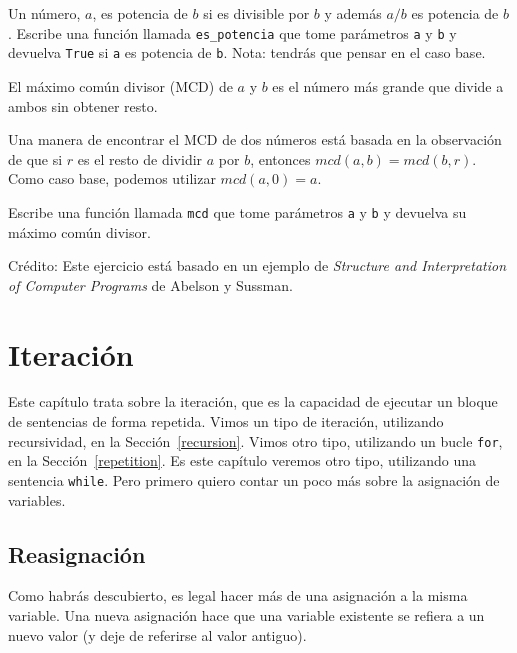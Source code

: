 \documentclass[10pt]{book}
\begin{document}
\begin{exercise}

Un número, $a$, es potencia de $b$ si es divisible por $b$
y además $a/b$ es potencia de $b$.  Escribe una función llamada
\verb"es_potencia" que tome parámetros {\tt a} y {\tt b}
y devuelva {\tt True} si {\tt a} es potencia de {\tt b}.
Nota: tendrás que pensar en el caso base.

\end{exercise}


\begin{exercise}

El máximo común divisor (MCD) de $a$ y $b$ es el número más grande
que divide a ambos sin obtener resto.

Una manera de encontrar el MCD de dos números está basada en la observación
de que si $r$ es el resto de dividir $a$ por $b$, entonces $mcd(a,
b) = mcd(b, r)$.  Como caso base, podemos utilizar $mcd(a, 0) = a$.

Escribe una función llamada
\verb"mcd" que tome parámetros {\tt a} y {\tt b}
y devuelva su máximo común divisor.

Crédito: Este ejercicio está basado en un ejemplo de
{\em Structure and Interpretation of Computer Programs} de Abelson y Sussman.

\end{exercise}


\chapter{Iteración}

Este capítulo trata sobre la iteración, que es la capacidad de ejecutar
un bloque de sentencias de forma repetida.  Vimos un tipo de iteración,
utilizando recursividad, en la Sección~\ref{recursion}.
Vimos otro tipo, utilizando un bucle {\tt for},
en la Sección~\ref{repetition}.  Es este capítulo veremos otro
tipo, utilizando una sentencia {\tt while}.
Pero primero quiero contar un poco más sobre la asignación de variables.


\section{Reasignación}

Como habrás descubierto, es legal hacer más de una
asignación a la misma variable.  Una nueva asignación hace que una variable existente
se refiera a un nuevo valor (y deje de referirse al valor antiguo).
\end{document}
